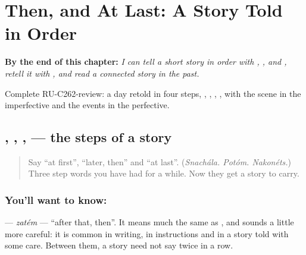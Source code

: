 
\chapter{Then, and At Last: A Story Told in Order}
\label{ch:ru-then-and-at-last-a-story-told-in-order}

\begin{chapteropening}
\textbf{By the end of this chapter:} \emph{I can tell a short story in order with , ,  and , retell it with , and read a connected story in the past.}

Complete RU-C262-review: a day retold in four steps, , , , , with the scene in the imperfective and the events in the perfective.
\end{chapteropening}

\section[\texorpdfstring{\ru{сначала}, \ru{потом} … (snachála, potóm …)}{сначала, потом … (snachála, potóm …)}]{, , ,  — the steps of a story}

\label{lesson:RU-C262-snachala-potom}



\begin{quote}
Say \textquotedblleft{}at first\textquotedblright{}, \textquotedblleft{}later, then\textquotedblright{} and \textquotedblleft{}at last\textquotedblright{}. (\emph{Snachála. Potóm. Nakonéts.}) Three step words you have had for a while. Now they get a story to carry.
\end{quote}

\subsection*{You'll want to know: }
\textbf{} — \emph{zatém} — \textquotedblleft{}after that, then\textquotedblright{}. It means much the same as \textbf{}, and sounds a little more careful: it is common in writing, in instructions and in a story told with some care. Between them, a story need not say \textbf{} twice in a row.

